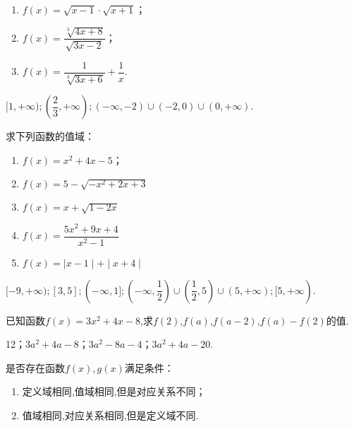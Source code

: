 \documentclass[lang=cn,newtx,10pt,scheme=chinese]{elegantbook}
\begin{document}
\begin{spacing}{1.8}
  \begin{enumerate}
    \item $f(x)=\sqrt{x-1}\cdot\sqrt{x+1}$；
    \item $f(x)=\dfrac{\sqrt[3]{4x+8}}{\sqrt{3x-2}}$；
    \item $f(x)=\dfrac1{\sqrt[3]{3x+6}}+\dfrac1x$.
  \end{enumerate}


  \begin{solution}
    $[1,+\infty);(\dfrac23,+\infty);(-\infty,-2)\cup(-2,0)\cup(0,+\infty)$.
  \end{solution}

  \begin{exercise}
    求下列函数的值域：
  \end{exercise}

  \begin{enumerate}
    \item $f(x)=x^2+4x-5$；
    \item $f(x)=5-\sqrt{-x^{2}+2x+3}$
    \item $f(x)=x+\sqrt{1-2x}$
    \item $f(x)=\dfrac{5x^{2}+9x+4}{x^{2}-1}$
    \item $f(x)=\mid x-1\mid+\mid x+4\mid $
  \end{enumerate}
\end{spacing}

\begin{solution}
  $[-9,+\infty);[3,5];(-\infty,1];(-\infty,\dfrac12)\cup(\dfrac12,5)\cup(5,+\infty);[5,+\infty)$.
\end{solution}

\begin{exercise}
  已知函数$f(x)=3x^2+4x-8$,求$f(2)$,$f(a)$,$f(a-2)$,$f(a)-f(2)$的值.
\end{exercise}

\begin{solution}
  12；$3a^2+4a-8$；$3a^2-8a-4$；$3a^2+4a-20$.
\end{solution}

\begin{exercise}\label{2017RJA.P74.17}
  是否存在函数$f(x),g(x)$满足条件：
\end{exercise}

\begin{enumerate}
  \item 定义域相同,值域相同,但是对应关系不同；
  \item 值域相同,对应关系相同,但是定义域不同.
\end{enumerate}
\end{document}
